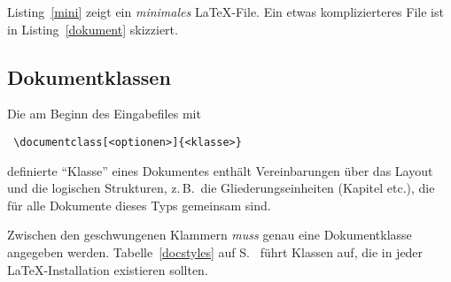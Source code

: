 Listing~\ref{mini} zeigt ein \emph{minimales} \LaTeX-File. Ein etwas 
komplizierteres File ist in Listing~\ref{dokument} skizziert.
 


\subsection{Dokumentklassen}\label{docsty}
 
Die am Beginn des Eingabefiles  mit
\begin{lstlisting}
 \documentclass[<optionen>]{<klasse>}
\end{lstlisting}
definierte "`Klasse"' eines Dokumentes enthält Vereinbarungen über das Layout 
und die logischen Strukturen, z.\,B.\ die Gliederungseinheiten (Kapitel etc.\@), 
die für alle Dokumente dieses Typs gemeinsam sind.

Zwischen den geschwungenen Klammern \emph{muss} genau eine Dokumentklasse
angegeben werden.  Tabelle~\ref{docstyles} auf S.~\pageref{docstyles} führt 
Klassen auf, die in jeder \LaTeX-Installation existieren sollten. 

